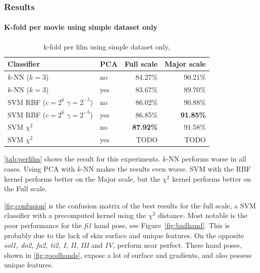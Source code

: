 \subsubsection{Results}

\paragraph{K-fold per movie using simple dataset only}


\begin{table}
\centering
\begin{tabular}{llrr}
\hline\hline
Classifier 		& PCA		&  	Full scale	& Major scale	\\
\hline
$k$-NN ($k=3$)	&	no	&  	84.27\%		& 90.21\%		\\
$k$-NN ($k=3$) 	&	yes	& 	83.67\%		& 89.70\%		\\
SVM RBF ($c=2^6$ $\gamma=2^{-5}$)		&	no	&	86.02\%	& 90.88\% \\
SVM RBF ($c=2^6$ $\gamma=2^{-5}$)		&	yes	& 	86.85\% & \textbf{91.85\%} \\
SVM $\chi^2$ &	no	&	\textbf{87.92\%}		& 91.58\% \\
SVM $\chi^2$ &	yes	&	TODO		& TODO \\
\hline
\end{tabular}
\caption{k-fold per film using simple dataset only,}
\label{tab:perfilm}
\end{table}

\autoref{tab:perfilm} shows the result for this experiments. $k$-NN performs worse in all cases. Using PCA with $k$-NN makes the results even worse. SVM with the RBF kernel performs better on the Major scale, but the $\chi^2$ kernel performs better on the Full scale. 

\autoref{fig:confusion} is the confusion matrix of the best results for the full scale, a SVM classifier with a precomputed kernel using the $\chi^2$ distance. Most notable is the poor performance for the \emph{fi1} hand pose, see Figure~\ref{fig:badhand}. This is probably due to the lack of skin surface and unique features. On the opposite \emph{sol1, do2, fa2, ti2, I, II, III }and \emph{IV}, perform near perfect. These hand poses, shown in \autoref{fig:goodhands}, expose a lot of surface and gradients, and also possess unique features.


